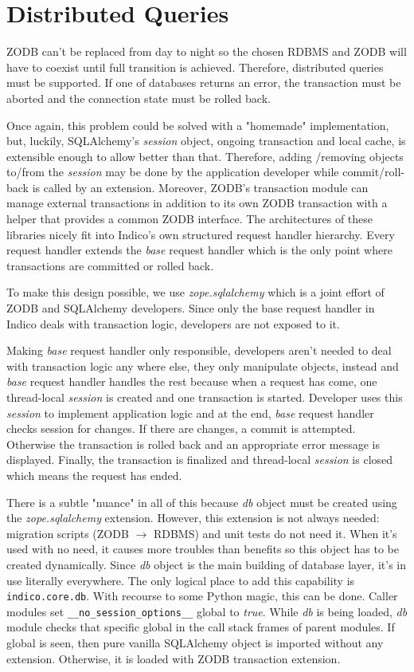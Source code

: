 \section{Distributed Queries}

ZODB can't be replaced from day to night so the chosen RDBMS and ZODB will have to coexist until full transition is achieved. Therefore, distributed queries must be supported. If one of databases returns an error, the transaction must be aborted and the connection state must be rolled back.

Once again, this problem could be solved with a "homemade" implementation, but, luckily, SQLAlchemy's \textit{session} object, ongoing transaction and local cache, is extensible enough to allow better than that. Therefore, adding /removing objects to/from the  \textit{session} may be done by the application developer while commit/roll-back is called by an extension. Moreover, ZODB's transaction module can manage external transactions in addition to its own ZODB transaction with a helper that provides a common ZODB interface. The architectures of these libraries nicely fit into Indico's own structured request handler hierarchy. Every request handler extends the \textit{base} request handler which is the only point where transactions are committed or rolled back.

To make this design possible, we use \textit{zope.sqlalchemy} which is a joint effort of ZODB and SQLAlchemy developers. Since only the base request handler in Indico deals with transaction logic, developers are not exposed to it.

Making \textit{base} request handler only responsible, developers aren't needed to deal with transaction logic any where else, they only manipulate objects, instead and \textit{base} request handler handles the rest because when a request has come, one thread-local \textit{session} is created and one transaction is started. Developer uses this \textit{session} to implement application logic and at the end, \textit{base} request handler checks session for changes. If there are changes, a commit is attempted. Otherwise the transaction is rolled back and an appropriate error message is displayed. Finally, the transaction is finalized and thread-local \textit{session} is closed which means the request has ended.

There is a subtle "nuance" in all of this because \textit{db} object must be created using the \textit{zope.sqlalchemy} extension. However, this extension is not always needed: migration scripts (ZODB $\rightarrow$ RDBMS) and unit tests do not need it. When it's used with no need, it causes more troubles than benefits so this object has to be created dynamically. Since \textit{db} object is the main building of database layer, it's in use literally everywhere. The only logical place to add this capability is \texttt{indico.core.db}. With recourse to some Python magic, this can be done. Caller modules set \texttt{\_\_no\_session\_options\_\_} global to \textit{true}. While \textit{db} is being loaded, \textit{db} module checks that specific global in the call stack frames of parent modules. If global is seen, then pure vanilla SQLAlchemy object is imported without any extension. Otherwise, it is loaded with ZODB transaction extension.

